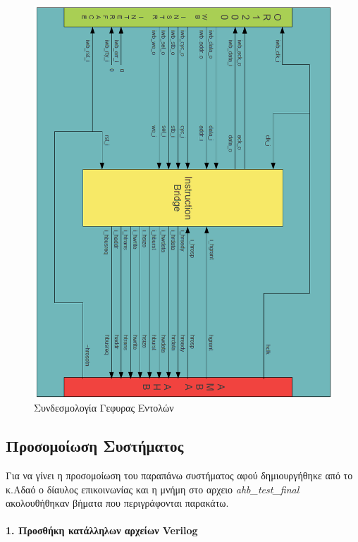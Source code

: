 \documentclass[a4paper,10pt]{article}
\numberwithin{figure}{section}
\numberwithin{table}{section}
\begin{document}
\begin{figure}[h!]
 \centering
 \includegraphics[bb=0 0 851 1125,scale=0.41]{./Images/signal_I.png}
 \caption{Συνδεσμολογία Γεφυρας Εντολών}
\end{figure}

\newpage
\subsection{Προσομοίωση Συστήματος}

Για να γίνει η προσομοίωση του παραπάνω συστήματος αφού δημιουργήθηκε από το κ.Αδαό ο δίαυλος επικοινωνίας και η μνήμη στο αρχειο \emph{ahb\_test\_final} ακολουθήθηκαν βήματα που περιγράφονται παρακάτω.
\newline

\paragraph{1. Προσθήκη κατάλληλων αρχείων Verilog \newline\newline}
\end{document}
